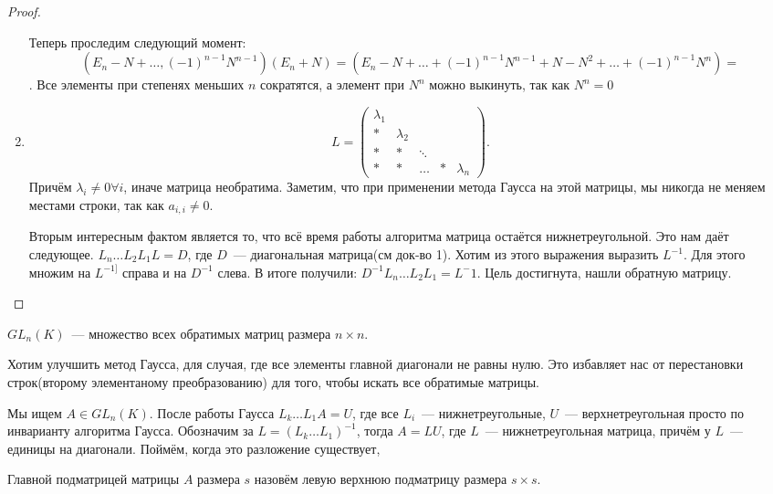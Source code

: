 \begin{proof}
\begin{enumerate}
            Теперь проследим следующий момент:
            $$(E_n - N + \dots, (-1)^{n-1}N^{n-1})(E_n + N)=
            (E_n - N + \dots + (-1)^{n-1}N^{n-1} + N - N^2 + \dots + (-1)^{n-1}N^n)=
            $$. Все элементы при степенях меньших $n$ сократятся, а элемент при $N^n$ можно 
            выкинуть, так как $N^n = 0$ 
        \item
             \[
            L = 
            \begin{pmatrix}
                \lambda_1&&&\\
                *&\lambda_2&&\\
                *&*&\ddots&&\\
                *&*&\dots&*&\lambda_n
            \end{pmatrix}
             .\] 
             Причём $\lambda_i \not= 0\forall i$, иначе матрица необратима.
             Заметим, что при применении метода Гаусса на этой матрицы, мы никогда не
             меняем местами строки, так как $a_{i,i} \not= 0$.

             Вторым интересным фактом является то, что всё время работы алгоритма матрица
             остаётся нижнетреугольной. Это нам даёт следующее.
             $L_n\ldots L_2L_1L=D$, где $D$~--- диагональная матрица(см док-во 1).
             Хотим из этого выражения выразить $L^{-1}$. Для этого множим на $L^{-1]}$ справа
             и на $D^{-1}$ слева. В итоге получили: $D^{-1}L_n\ldots L_2L_1 = L^-1$. 
             Цель достигнута, нашли обратную матрицу.
    \end{enumerate}
\end{proof}
\begin{definition}
    $GL_n(K)$~--- множество всех обратимых матриц размера $n\times n$.
\end{definition}
\begin{motivation}
    Хотим улучшить метод Гаусса, для случая, где все элементы главной
    диагонали не равны нулю. Это избавляет нас от перестановки строк(второму элементаному
    преобразованию) для того, чтобы искать все обратимые матрицы.

    Мы ищем $A\in GL_n(K)$.
    После работы Гаусса $L_k\ldots L_1A = U$, где все $L_i$~--- нижнетреугольные,
    $U$~--- верхнетреугольная просто по инварианту алгоритма Гаусса.
    Обозначим за $L = (L_k\ldots L_1)^{-1}$, тогда 
    $A = LU$, где $L$~--- нижнетреугольная матрица, причём у $L$~--- единицы на диагонали.
    Поймём, когда это разложение существует, 
\end{motivation}
\begin{definition}
    Главной подматрицей матрицы $A$ размера $s$ назовём левую верхнюю подматрицу
    размера $s\times s$.
\end{definition}
